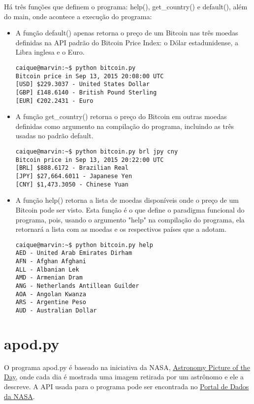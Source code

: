 \documentclass{article}
\begin{document}
Há três funções que definem o programa: help(), get\_country() e default(), além do main, onde acontece a execução do programa:
\begin{itemize}
    \item A função default() apenas retorna o preço de um Bitcoin nas três moedas definidas na API padrão do Bitcoin Price Index: o Dólar estadunidense, a Libra inglesa e o Euro.
\begin{verbatim}caique@marvin:~$ python bitcoin.py 
Bitcoin price in Sep 13, 2015 20:08:00 UTC
[USD] $229.3037 - United States Dollar
[GBP] £148.6140 - British Pound Sterling
[EUR] €202.2431 - Euro
\end{verbatim}
    
    \item A função get\_country() retorna o preço do Bitcoin em outras moedas definidas como argumento na compilação do programa, incluindo as três usadas no padrão default.
\begin{verbatim}caique@marvin:~$ python bitcoin.py brl jpy cny
Bitcoin price in Sep 13, 2015 20:22:00 UTC
[BRL] $888.6172 - Brazilian Real
[JPY] $27,664.6011 - Japanese Yen
[CNY] $1,473.3050 - Chinese Yuan
    \end{verbatim}
    
    \item A função help() retorna a lista de moedas disponíveis onde o preço de um Bitcoin pode ser visto. Esta função é o que define o paradigma funcional do programa, pois, usando o argumento "help" na compilação do programa, ela retornará a lista com as moedas e os respectivos países que a adotam.
\begin{verbatim}caique@marvin:~$ python bitcoin.py help
AED - United Arab Emirates Dirham
AFN - Afghan Afghani
ALL - Albanian Lek
AMD - Armenian Dram
ANG - Netherlands Antillean Guilder
AOA - Angolan Kwanza
ARS - Argentine Peso
AUD - Australian Dollar    
\end{verbatim}
\end{itemize}

\newpage
\section*{apod.py}
O programa apod.py é baseado na iniciativa da NASA, \href{http://apod.nasa.gov/apod/astropix.html}{Astronomy Picture of the Day}, onde cada dia é mostrada uma imagem retirada por um astrônomo e ele a descreve. A API usada para o programa pode ser encontrada no \href{https://data.nasa.gov/developer}{Portal de Dados da NASA}.
\end{document}
